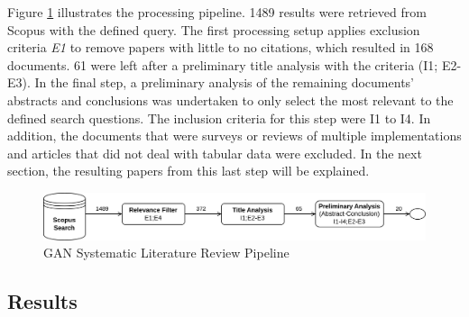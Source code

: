 Figure \ref{fig:slr_pipeline} illustrates the processing pipeline. 1489 results were retrieved from Scopus with the defined query. The first processing setup applies exclusion criteria \textit{E1} to remove papers with little to no citations, which resulted in 168 documents. 61 were left after a preliminary title analysis with the criteria (I1; E2-E3). In the final step, a preliminary analysis of the remaining documents' abstracts and conclusions was undertaken to only select the most relevant to the defined search questions. The inclusion criteria for this step were I1 to I4. In addition, the documents that were surveys or reviews of multiple implementations and articles that did not deal with tabular data were excluded. In the next section, the resulting papers from this last step will be explained.

\begin{figure}[]
\centering
\includegraphics[width=\textwidth]{figures/slr_pipeline.png}
\caption{GAN Systematic Literature Review Pipeline}
\label{fig:slr_pipeline}
\end{figure}




\subsection{Results}\label{sec:gan_sota_results}

